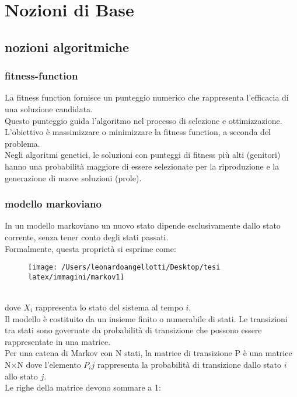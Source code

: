 \documentclass[a4paper,12pt]{report}
\begin{document}
\chapter{Nozioni di Base}

\section{nozioni algoritmiche}

\subsection{fitness-function}

La fitness function fornisce un punteggio numerico che rappresenta l'efficacia di una soluzione candidata. \\
Questo punteggio guida l'algoritmo nel processo di selezione e ottimizzazione. \\
L'obiettivo è massimizzare o minimizzare la fitness function, a seconda del problema. \\
Negli algoritmi genetici, le soluzioni con punteggi di fitness più alti (genitori) hanno una probabilità maggiore di essere selezionate per la riproduzione e la generazione di nuove soluzioni (prole).

\subsection{modello markoviano}

In un modello markoviano un nuovo stato dipende esclusivamente dallo stato corrente, senza tener conto degli stati passati. \\
Formalmente, questa proprietà si esprime come: 

\begin{figure}[H]
    \centering
    \texttt{[image: /Users/leonardoangellotti/Desktop/tesi latex/immagini/markov1]} 
    \label{fig:immagine1}
\end{figure}
\\
dove $X_i$ rappresenta lo stato del sistema al tempo $i$. \\
Il modello è costituito da un insieme finito o numerabile di stati. Le transizioni tra stati sono governate da probabilità di transizione che possono essere rappresentate in una matrice. \\
Per una catena di Markov con N stati, la matrice di transizione P è una matrice N×N dove l'elemento $P_ij$ rappresenta la probabilità di transizione dallo stato $i$ allo stato $j$. \\
Le righe della matrice devono sommare a 1: 
\end{document}
